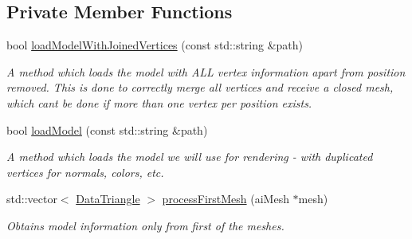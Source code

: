 \subsection*{Private Member Functions}
\begin{DoxyCompactItemize}
\item 
bool \mbox{\hyperlink{classpepr3d_1_1_model_importer_aa9220087658f958e335ed87632c364be}{load\+Model\+With\+Joined\+Vertices}} (const std\+::string \&path)
\begin{DoxyCompactList}\small\item\em A method which loads the model with A\+LL vertex information apart from position removed. This is done to correctly merge all vertices and receive a closed mesh, which can\textquotesingle{}t be done if more than one vertex per position exists. \end{DoxyCompactList}\item 
bool \mbox{\hyperlink{classpepr3d_1_1_model_importer_aa3ee5189df6ae1d8530915fe8cc964e7}{load\+Model}} (const std\+::string \&path)
\begin{DoxyCompactList}\small\item\em A method which loads the model we will use for rendering -\/ with duplicated vertices for normals, colors, etc. \end{DoxyCompactList}\item 
std\+::vector$<$ \mbox{\hyperlink{classpepr3d_1_1_data_triangle}{Data\+Triangle}} $>$ \mbox{\hyperlink{classpepr3d_1_1_model_importer_acf84e4d461505e722c827812418ef0d1}{process\+First\+Mesh}} (ai\+Mesh $\ast$mesh)
\begin{DoxyCompactList}\small\item\em Obtains model information only from first of the meshes. \end{DoxyCompactList}\end{DoxyCompactItemize}
